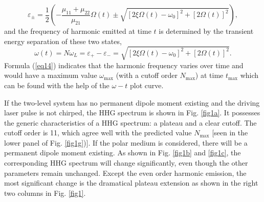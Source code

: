 \documentclass[10pt,letterpaper]{article}
\begin{document}
\begin{equation}
{\varepsilon _ \pm } = \frac{1}{2}\left( { - \frac{{{\mu _{11}} + {\mu _{22}}}}{{{\mu _{21}}}}\Omega \left( t \right) \pm \sqrt {{{\left[ {2\xi \Omega \left( t \right) - {\omega _0}} \right]}^2} + {{\left[ {2\Omega \left( t \right)} \right]}^2}} } \right),
\label{eq13}
\end{equation}
and the frequency of harmonic emitted at time $t$ is determined by the transient energy separation of these two states,
\begin{equation}
\omega(t)  = N{\omega _L}  = {\varepsilon _ + } - {\varepsilon _ - } = \sqrt {{{\left[ {2\xi \Omega \left( t \right) - {\omega _0}} \right]}^2} + {{\left[ {2\Omega \left( t \right)} \right]}^2}}.
\label{eq14}
\end{equation}
Formula (\ref{eq14}) indicates that the harmonic frequency varies over time and would have a maximum value $\omega_{\textrm{max}}$ (with a cutoff order $N_{\textrm{max}}$) at time $t_{\textrm{max}}$ which can be found with the help of the $\omega-t$ plot curve.

If the two-level system has no permanent dipole moment existing and the driving laser pulse is not chirped, the HHG spectrum is shown in Fig. \ref{fig1a}. It possesses the generic characteristics of a HHG spectrum: a plateau and a clear cutoff. The cutoff order is 11, which agree well with the predicted value $N_{\textrm{max}}$ [seen in the lower panel of Fig. \ref{fig1g})]. If the polar medium is considered, there will be a permanent dipole moment existing. As shown in Fig. \ref{fig1b} and \ref{fig1c}, the corresponding HHG spectrum will change significantly, even though the other parameters remain unchanged. Except the even order harmonic emission, the most significant change is the dramatical plateau extension as shown in the right two columns in Fig. \ref{fig1}. 
\end{document}
